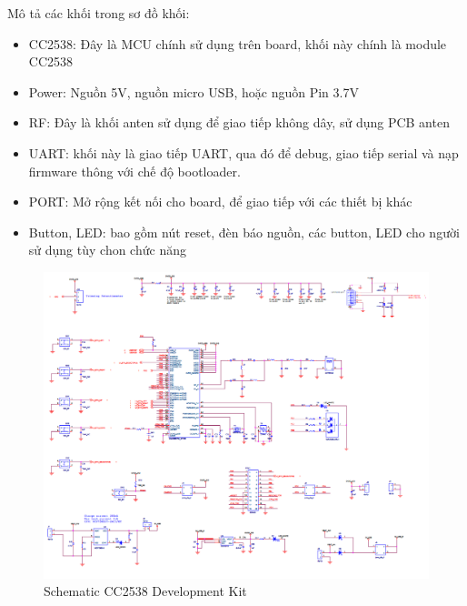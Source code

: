 \documentclass{report}
\begin{document}
Mô tả các khối trong sơ đồ khối: 
\begin{itemize}
	\item CC2538: Đây là MCU chính sử dụng trên board, khối này chính là module CC2538
	\item Power: Nguồn 5V, nguồn micro USB, hoặc nguồn Pin 3.7V
	\item RF: Đây là khối anten sử dụng để giao tiếp không dây, sử dụng PCB anten
	\item UART: khối này là giao tiếp UART, qua đó để debug, giao tiếp serial và nạp firmware thông với chế độ bootloader.
	\item PORT: Mở rộng kết nối cho board, để giao tiếp với các thiết bị khác
	\item Button, LED: bao gồm nút reset, đèn báo nguồn, các button, LED cho người sử dụng tùy chon chức năng
\end{itemize}
\newpage
\begin{figure}[h]
	\centering
	\includegraphics[scale = 0.5]{fig36.png}
	\caption{Schematic CC2538 Development Kit}
	\label{fig:Graph36}
\end{figure}
\end{document}
